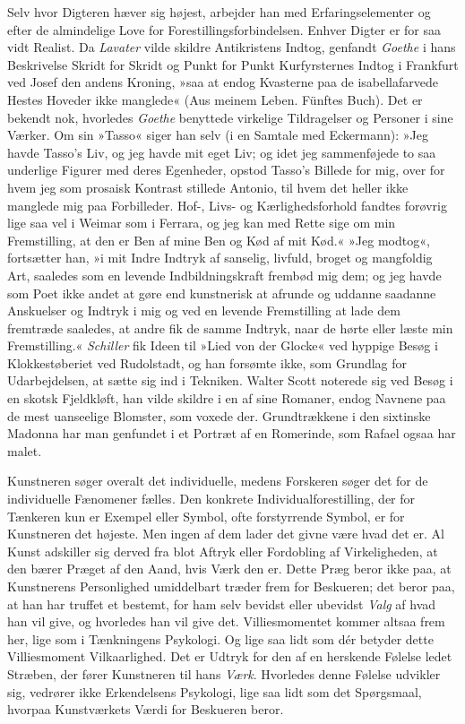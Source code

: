 \documentclass[12pt,a4paper,openany]{book}
\newcommand{\opage}[1]{\marginnote{\footnotesize\textit{[#1]}}}
\begin{document}
Selv hvor Digteren hæver sig højest, arbejder han med Erfaringselementer
og efter de almindelige Love for Forestillingsforbindelsen. Enhver
Digter er for saa vidt Realist. Da \emph{Lavater} vilde skildre
Antikristens Indtog, genfandt \emph{Goethe} i hans Beskrivelse Skridt
for Skridt og Punkt for Punkt Kurfyrsternes Indtog i Frankfurt ved Josef
den andens Kroning, »saa at endog Kvasterne paa de isabellafarvede
Hestes Hoveder ikke manglede« (Aus meinem Leben. Fünftes Buch). Det er
bekendt nok, hvorledes \emph{Goethe} benyttede virkelige Tildragelser og
Personer i sine Værker. Om sin »Tasso« siger han selv (i en Samtale med
Eckermann): »Jeg havde Tasso’s Liv, og jeg havde mit eget Liv; og idet
jeg sammenføjede to saa underlige Figurer med deres Egenheder, opstod
Tasso’s Billede for mig, over for hvem jeg som prosaisk Kontrast
stillede Antonio, til hvem det heller ikke manglede mig paa Forbilleder.
Hof-, Livs- og Kærlighedsforhold fandtes forøvrig lige saa vel i Weimar
som i Ferrara, og jeg kan med Rette sige om min Fremstilling, at den er
Ben af mine Ben og Kød af mit Kød.« »Jeg modtog«, fortsætter han, »i mit
Indre Indtryk af sanselig, livfuld, broget og mangfoldig Art, saaledes
som en levende Indbildningskraft frembød mig dem; og jeg havde som Poet
ikke andet at gøre end kunstnerisk at afrunde og uddanne saadanne
Anskuelser og Indtryk i mig og ved en
\opage{225}levende Fremstilling at lade dem fremtræde saaledes, at andre
fik de samme Indtryk, naar de hørte eller læste min Fremstilling.«
\emph{Schiller} fik Ideen til »Lied von der Glocke« ved hyppige Besøg i
Klokkestøberiet ved Rudolstadt, og han forsømte ikke, som Grundlag for
Udarbejdelsen, at sætte sig ind i Tekniken. Walter Scott noterede sig
ved Besøg i en skotsk Fjeldkløft, han vilde skildre i en af sine
Romaner, endog Navnene paa de mest uanseelige Blomster, som voxede der.
Grundtrækkene i den sixtinske Madonna har man genfundet i et Portræt af
en Romerinde, som Rafael ogsaa har malet.

Kunstneren søger overalt det individuelle, medens Forskeren søger det
for de individuelle Fænomener fælles. Den konkrete
Individualforestilling, der for Tænkeren kun er Exempel eller Symbol,
ofte forstyrrende Symbol, er for Kunstneren det højeste. Men ingen af
dem lader det givne være hvad det er. Al Kunst adskiller sig derved fra
blot Aftryk eller Fordobling af Virkeligheden, at den bærer Præget af
den Aand, hvis Værk den er. Dette Præg beror ikke paa, at Kunstnerens
Personlighed umiddelbart træder frem for Beskueren; det beror paa, at
han har truffet et bestemt, for ham selv bevidst eller ubevidst
\emph{Valg} af hvad han vil give, og hvorledes han vil give det.
Villiesmomentet kommer altsaa frem her, lige som i Tænkningens
Psykologi. Og lige saa lidt som dér betyder dette Villiesmoment
Vilkaarlighed. Det er Udtryk for den af en herskende Følelse ledet
Stræben, der fører Kunstneren til hans \emph{Værk}. Hvorledes denne
Følelse udvikler sig, vedrører ikke Erkendelsens Psykologi, lige saa
lidt som det Spørgsmaal, hvorpaa Kunstværkets Værdi for Beskueren beror.
\end{document}
